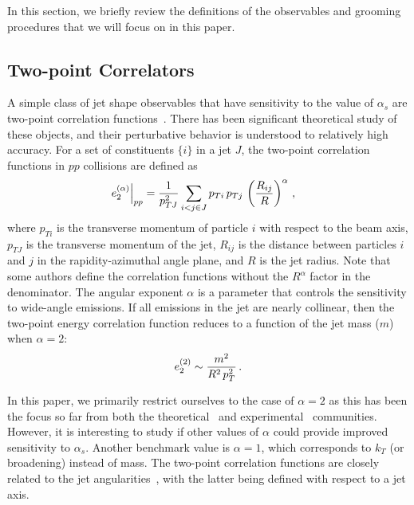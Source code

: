 
In this section, we briefly review the definitions of the observables and grooming procedures that we will focus on in this paper.

\subsection{Two-point Correlators}\label{sec:shape_def}

A simple class of jet shape observables that have sensitivity to the value of $\alpha_s$ are two-point correlation functions~\cite{Banfi:2004yd,Larkoski:2013eya}.
%
There has been significant theoretical study of these objects, and their perturbative behavior is understood to relatively high accuracy.
%
For a set of constituents $\{i\}$ in a jet $J$, the two-point correlation functions in $pp$ collisions are defined as
%
\begin{align}
\label{eq:ppe2}
\left.e_{2}^{(\alpha)}\right|_{pp}&=\frac{1}{p_{TJ}^2}\sum_{i<j\in J} p_{Ti} \, p_{Tj} \, \left(\frac{R_{ij}}{R}\right)^\alpha\,, 
\end{align}
where $p_{Ti}$ is the transverse momentum of particle $i$ with respect to the beam axis, $p_{TJ}$ is the transverse momentum of the jet, $R_{ij}$ is the distance between particles $i$ and $j$ in the rapidity-azimuthal angle plane, and $R$ is the jet radius.
%
Note that some authors define the correlation functions without the $R^\alpha$ factor in the denominator.
%
The angular exponent $\alpha$ is a parameter that controls the sensitivity to wide-angle emissions.
%
If all emissions in the jet are nearly collinear, then the two-point energy correlation function reduces to a function of the jet mass ($m$) when $\alpha=2$:
\begin{equation}
e_{2}^{(2)} \sim \frac{m^2}{R^2\, p_{T}^2}\,.
\end{equation} 

In this paper, we primarily restrict ourselves to the case of $\alpha=2$ as this has been the focus so far from both the theoretical~\cite{Frye:2016okc,Frye:2016aiz,Marzani:2017kqd,Marzani:2017mva} and experimental~\cite{Aaboud:2017qwh,CMS-PAS-SMP-16-010} communities.
%
However, it is interesting to study if other values of $\alpha$ could provide improved sensitivity to $\alpha_s$.
%
Another benchmark value is $\alpha=1$, which corresponds to $k_T$ (or broadening) instead of mass.
%
The two-point correlation functions are closely related to the jet angularities~\cite{Berger:2003iw,Almeida:2008yp,Ellis:2010rwa,Larkoski:2014pca}, with the latter being defined with respect to a jet axis.

